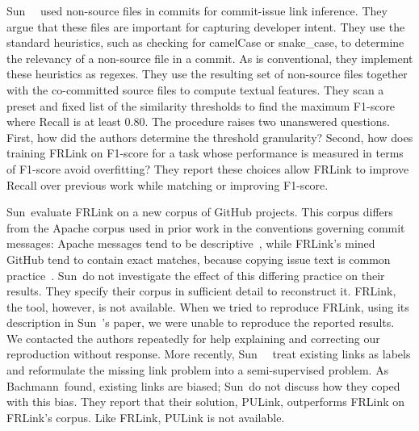 Sun~\etal~\cite{FRLink} used non-source files in commits for commit-issue link
inference. They argue that these files are important for capturing developer
intent. They use the standard heuristics, such as checking for camelCase or
snake\_case, to determine the relevancy of a non-source file in a commit. As is
conventional, they implement these heuristics as regexes. They use the resulting
set of non-source files together with the co-committed source files to compute
textual features. They scan a preset and fixed list of the similarity thresholds
to find the maximum F1-score where Recall is at least 0.80. The procedure raises
two unanswered questions. First, how did the authors determine the threshold
granularity? Second, how does training FRLink on F1-score for a task whose
performance is measured in terms of F1-score avoid overfitting? They report
these choices allow FRLink to improve Recall over previous work while matching
or improving F1-score. 

Sun~\etal evaluate FRLink on a new corpus of GitHub projects. This corpus
differs from the Apache corpus used in prior work in the conventions governing
commit messages:  Apache messages tend to be descriptive~\cite{ApachePractice},
while FRLink's mined GitHub tend to contain exact matches, because copying issue
text is common practice~\cite{ruan2019deeplink}. Sun~\etal do not investigate
the effect of this differing practice on their results. They specify their
corpus in sufficient detail to reconstruct it. FRLink, the tool, however, is not
available. When we tried to reproduce FRLink, using its description in
Sun~\etal's paper, we were unable to reproduce the reported results.   
We contacted the authors repeatedly for help explaining and correcting our
reproduction without response. More recently, Sun~\etal~\cite{PULink} treat
existing links as labels and reformulate the missing link problem into a
semi-supervised problem. As Bachmann~\etal found, existing links are biased;
Sun~\etal do not discuss how they coped with this bias. They report that their
solution, PULink, outperforms FRLink on FRLink's corpus. Like FRLink, PULink is
not available.

